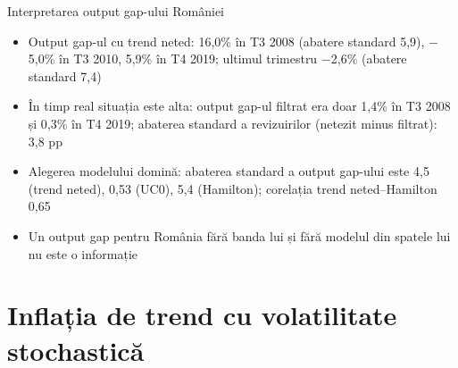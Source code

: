 \begin{frame}{Interpretarea output gap-ului României}
\itemsize{\small}
\begin{itemize}
    \item Output gap-ul cu trend neted: 16{,}0\% în T3 2008 (abatere standard 5{,}9), \ensuremath{-}5{,}0\% în T3 2010, 5{,}9\% în T4 2019; ultimul trimestru \ensuremath{-}2{,}6\% (abatere standard 7{,}4)
    \item În timp real situația este alta: output gap-ul filtrat era doar 1{,}4\% în T3 2008 și 0{,}3\% în T4 2019; abaterea standard a revizuirilor (netezit minus filtrat): 3{,}8 pp 
    \item Alegerea modelului domină: abaterea standard a output gap-ului este 4{,}5 (trend neted), 0{,}53 (UC0), 5{,}4 (Hamilton); corelația trend neted--Hamilton 0{,}65
    \item Un output gap pentru România fără banda lui și fără modelul din spatele lui nu este o informație
\end{itemize}
\end{frame}


\section{Inflația de trend cu volatilitate stochastică}

